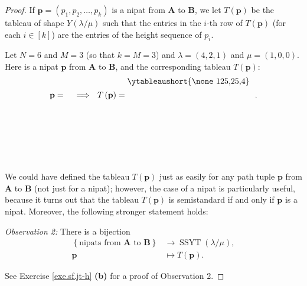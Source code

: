 \begin{proof}
If $\mathbf{p}=\left(  p_{1},p_{2},\ldots,p_{k}\right)  $ is a nipat from
$\mathbf{A}$ to $\mathbf{B}$, we let $T\left(  \mathbf{p}\right)  $ be the
tableau of shape $Y\left(  \lambda/\mu\right)  $ such that the entries in the
$i$-th row of $T\left(  \mathbf{p}\right)  $ (for each $i\in\left[  k\right]
$) are the entries of the height sequence of $p_{i}$.

\begin{example}
Let $N=6$ and $M=3$ (so that $k=M=3$) and $\lambda=\left(  4,2,1\right)  $ and
$\mu=\left(  1,0,0\right)  $. Here is a nipat $\mathbf{p}$ from $\mathbf{A}$
to $\mathbf{B}$, and the corresponding tableau $T\left(  \mathbf{p}\right)  $:%
\[
\mathbf{p}=%
\raisebox{-6.5pc}{
}%
\ \ \Longrightarrow\ \ T\left(  \mathbf{p}\right)
=\raisebox{1.4pc}{\ytableaushort{\none 125,25,4}}\ \ .
\]

\end{example}

We could have defined the tableau $T\left(  \mathbf{p}\right)  $ just as
easily for any path tuple $\mathbf{p}$ from $\mathbf{A}$ to $\mathbf{B}$ (not
just for a nipat); however, the case of a nipat is particularly useful,
because it turns out that the tableau $T\left(  \mathbf{p}\right)  $ is
semistandard if and only if $\mathbf{p}$ is a nipat. Moreover, the following
stronger statement holds:

\begin{statement}
\textit{Observation 2:} There is a bijection%
\begin{align*}
\left\{  \text{nipats from }\mathbf{A}\text{ to }\mathbf{B}\right\}   &
\rightarrow\operatorname*{SSYT}\left(  \lambda/\mu\right)  ,\\
\mathbf{p}  &  \mapsto T\left(  \mathbf{p}\right)  .
\end{align*}

\end{statement}

See Exercise \ref{exe.sf.jt-h} \textbf{(b)} for a proof of Observation 2.


\end{proof}
